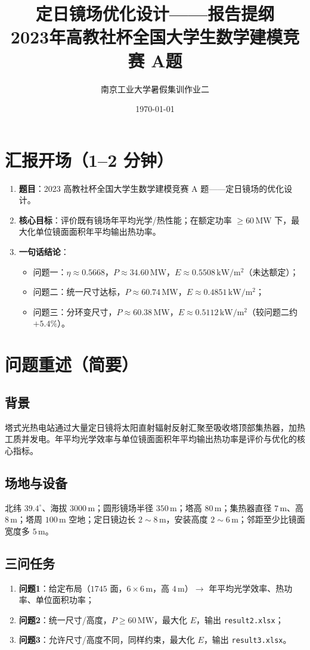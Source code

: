 \documentclass[12pt,a4paper]{ctexart}
\title{\textbf{定日镜场优化设计——报告提纲}\\[0.4em]
\large 2023年高教社杯全国大学生数学建模竞赛 A题}
\author{南京工业大学暑假集训\quad 作业二}
\date{\today}
\begin{document}
\maketitle
\tableofcontents
\newpage

\section{汇报开场（1--2 分钟）}
\begin{enumerate}
  \item \textbf{题目}：2023 高教社杯全国大学生数学建模竞赛 A 题——定日镜场的优化设计。
  \item \textbf{核心目标}：评价既有镜场年平均光学/热性能；在额定功率 $\ge 60\,\mathrm{MW}$ 下，最大化单位镜面面积年平均输出热功率。
  \item \textbf{一句话结论}：
  \begin{itemize}
    \item 问题一：$\eta\approx0.5668$，$P\approx34.60\,\mathrm{MW}$，$E\approx0.5508\,\mathrm{kW/m^2}$（未达额定）；
    \item 问题二：统一尺寸达标，$P\approx60.74\,\mathrm{MW}$，$E\approx0.4851\,\mathrm{kW/m^2}$；
    \item 问题三：分环变尺寸，$P\approx60.38\,\mathrm{MW}$，$E\approx0.5112\,\mathrm{kW/m^2}$（较问题二约 $+5.4\%$）。
  \end{itemize}
\end{enumerate}

\section{问题重述（简要）}
\subsection{背景}
塔式光热电站通过大量定日镜将太阳直射辐射反射汇聚至吸收塔顶部集热器，加热工质并发电。年平均光学效率与单位镜面面积年平均输出热功率是评价与优化的核心指标。

\subsection{场地与设备}
北纬 $39.4^\circ$、海拔 $3000\,\mathrm{m}$；圆形镜场半径 $350\,\mathrm{m}$；塔高 $80\,\mathrm{m}$；集热器直径 $7\,\mathrm{m}$、高 $8\,\mathrm{m}$；塔周 $100\,\mathrm{m}$ 空地；定日镜边长 $2\sim8\,\mathrm{m}$，安装高度 $2\sim6\,\mathrm{m}$；邻距至少比镜面宽度多 $5\,\mathrm{m}$。

\subsection{三问任务}
\begin{enumerate}
  \item \textbf{问题1}：给定布局（$1745$ 面，$6\times6\,\mathrm{m}$，高 $4\,\mathrm{m}$）$\rightarrow$ 年平均光学效率、热功率、单位面积功率；
  \item \textbf{问题2}：统一尺寸/高度，$P\ge60\,\mathrm{MW}$，最大化 $E$，输出 \texttt{result2.xlsx}；
  \item \textbf{问题3}：允许尺寸/高度不同，同样约束，最大化 $E$，输出 \texttt{result3.xlsx}。
\end{enumerate}
\end{document}
